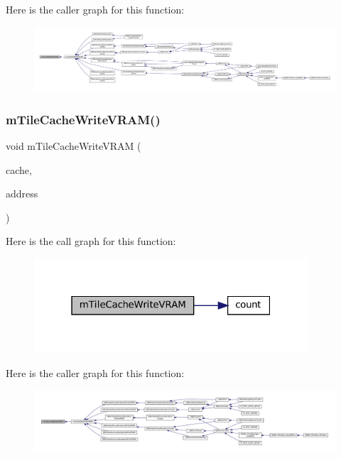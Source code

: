 Here is the caller graph for this function\+:
\nopagebreak
\begin{figure}[H]
\begin{center}
\leavevmode
\includegraphics[width=350pt]{tile-cache_8c_a49ed123bd2aa01fafd4affa947ed5a62_icgraph}
\end{center}
\end{figure}
\mbox{\label{tile-cache_8c_a8234621c3fb1acb87f216401cce3f173}} 
\subsubsection{\texorpdfstring{m\+Tile\+Cache\+Write\+V\+R\+A\+M()}{mTileCacheWriteVRAM()}}
{\footnotesize\ttfamily void m\+Tile\+Cache\+Write\+V\+R\+AM (\begin{DoxyParamCaption}\item[{struct m\+Tile\+Cache $\ast$}]{cache,  }\item[{uint32\+\_\+t}]{address }\end{DoxyParamCaption})}

Here is the call graph for this function\+:
\nopagebreak
\begin{figure}[H]
\begin{center}
\leavevmode
\includegraphics[width=289pt]{tile-cache_8c_a8234621c3fb1acb87f216401cce3f173_cgraph}
\end{center}
\end{figure}
Here is the caller graph for this function\+:
\nopagebreak
\begin{figure}[H]
\begin{center}
\leavevmode
\includegraphics[width=350pt]{tile-cache_8c_a8234621c3fb1acb87f216401cce3f173_icgraph}
\end{center}
\end{figure}
